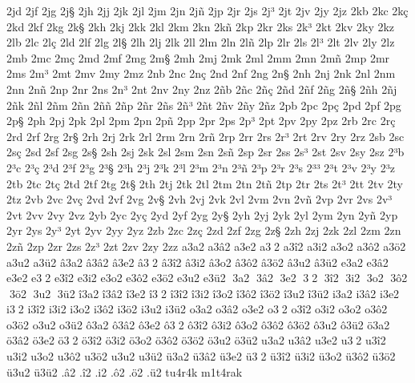 {2jd
2jf
2jg
2j^^a7
2jh
2jj
2jk
2jl
2jm
2jn
2j^^f1
2jp
2jr
2js
2j^^b3
2jt
2jv
2jy
2jz
2kb
2kc
2k^^e7
2kd
2kf
2kg
2k^^a7
2kh
2kj
2kk
2kl
2km
2kn
2k^^f1
2kp
2kr
2ks
2k^^b3
2kt
2kv
2ky
2kz
2lb
2lc
2l^^e7
2ld
2lf
2lg
2l^^a7
2lh
2lj
2lk
2ll
2lm
2ln
2l^^f1
2lp
2lr
2ls
2l^^b3
2lt
2lv
2ly
2lz
2mb
2mc
2m^^e7
2md
2mf
2mg
2m^^a7
2mh
2mj
2mk
2ml
2mm
2mn
2m^^f1
2mp
2mr
2ms
2m^^b3
2mt
2mv
2my
2mz
2nb
2nc
2n^^e7
2nd
2nf
2ng
2n^^a7
2nh
2nj
2nk
2nl
2nm
2nn
2n^^f1
2np
2nr
2ns
2n^^b3
2nt
2nv
2ny
2nz
2^^f1b
2^^f1c
2^^f1^^e7
2^^f1d
2^^f1f
2^^f1g
2^^f1^^a7
2^^f1h
2^^f1j
2^^f1k
2^^f1l
2^^f1m
2^^f1n
2^^f1^^f1
2^^f1p
2^^f1r
2^^f1s
2^^f1^^b3
2^^f1t
2^^f1v
2^^f1y
2^^f1z
2pb
2pc
2p^^e7
2pd
2pf
2pg
2p^^a7
2ph
2pj
2pk
2pl
2pm
2pn
2p^^f1
2pp
2pr
2ps
2p^^b3
2pt
2pv
2py
2pz
2rb
2rc
2r^^e7
2rd
2rf
2rg
2r^^a7
2rh
2rj
2rk
2rl
2rm
2rn
2r^^f1
2rp
2rr
2rs
2r^^b3
2rt
2rv
2ry
2rz
2sb
2sc
2s^^e7
2sd
2sf
2sg
2s^^a7
2sh
2sj
2sk
2sl
2sm
2sn
2s^^f1
2sp
2sr
2ss
2s^^b3
2st
2sv
2sy
2sz
2^^b3b
2^^b3c
2^^b3^^e7
2^^b3d
2^^b3f
2^^b3g
2^^b3^^a7
2^^b3h
2^^b3j
2^^b3k
2^^b3l
2^^b3m
2^^b3n
2^^b3^^f1
2^^b3p
2^^b3r
2^^b3s
2^^b3^^b3
2^^b3t
2^^b3v
2^^b3y
2^^b3z
2tb
2tc
2t^^e7
2td
2tf
2tg
2t^^a7
2th
2tj
2tk
2tl
2tm
2tn
2t^^f1
2tp
2tr
2ts
2t^^b3
2tt
2tv
2ty
2tz
2vb
2vc
2v^^e7
2vd
2vf
2vg
2v^^a7
2vh
2vj
2vk
2vl
2vm
2vn
2v^^f1
2vp
2vr
2vs
2v^^b3
2vt
2vv
2vy
2vz
2yb
2yc
2y^^e7
2yd
2yf
2yg
2y^^a7
2yh
2yj
2yk
2yl
2ym
2yn
2y^^f1
2yp
2yr
2ys
2y^^b3
2yt
2yv
2yy
2yz
2zb
2zc
2z^^e7
2zd
2zf
2zg
2z^^a7
2zh
2zj
2zk
2zl
2zm
2zn
2z^^f1
2zp
2zr
2zs
2z^^b3
2zt
2zv
2zy
2zz
a3a2
a3^^e22
a3e2
a3^^112
a3^^ee2
a3i2
a3o2
a3^^f42
a3^^f62
a3u2
a3^^fc2
^^e23a2
^^e23^^e22
^^e23e2
^^e23^^112
^^e23^^ee2
^^e23i2
^^e23o2
^^e23^^f42
^^e23^^f62
^^e23u2
^^e23^^fc2
e3a2
e3^^e22
e3e2
e3^^112
e3^^ee2
e3i2
e3o2
e3^^f42
e3^^f62
e3u2
e3^^fc2
^^113a2
^^113^^e22
^^113e2
^^113^^112
^^113^^ee2
^^113i2
^^113o2
^^113^^f42
^^113^^f62
^^113u2
^^113^^fc2
^^ee3a2
^^ee3^^e22
^^ee3e2
^^ee3^^112
^^ee3^^ee2
^^ee3i2
^^ee3o2
^^ee3^^f42
^^ee3^^f62
^^ee3u2
^^ee3^^fc2
i3a2
i3^^e22
i3e2
i3^^112
i3^^ee2
i3i2
i3o2
i3^^f42
i3^^f62
i3u2
i3^^fc2
o3a2
o3^^e22
o3e2
o3^^112
o3^^ee2
o3i2
o3o2
o3^^f42
o3^^f62
o3u2
o3^^fc2
^^f43a2
^^f43^^e22
^^f43e2
^^f43^^112
^^f43^^ee2
^^f43i2
^^f43o2
^^f43^^f42
^^f43^^f62
^^f43u2
^^f43^^fc2
^^f63a2
^^f63^^e22
^^f63e2
^^f63^^112
^^f63^^ee2
^^f63i2
^^f63o2
^^f63^^f42
^^f63^^f62
^^f63u2
^^f63^^fc2
u3a2
u3^^e22
u3e2
u3^^112
u3^^ee2
u3i2
u3o2
u3^^f42
u3^^f62
u3u2
u3^^fc2
^^fc3a2
^^fc3^^e22
^^fc3e2
^^fc3^^112
^^fc3^^ee2
^^fc3i2
^^fc3o2
^^fc3^^f42
^^fc3^^f62
^^fc3u2
^^fc3^^fc2
.^^e22
.^^ee2
.i2
.^^f42
.^^f62
.^^fc2
tu4r4k
m1t4rak
}
